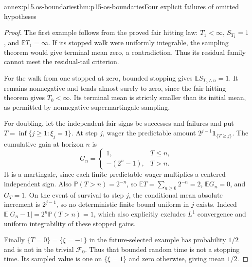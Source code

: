 \begin{annexitem}{annex:p15.os-boundaries}{thm:p15-os-boundaries}{Four explicit failures of omitted hypotheses}
\begin{proof}
The first example follows from the proved fair hitting law:
\(T_1<\infty\), \(S_{T_1}=1\), and \(\mathbb ET_1=\infty\).
If its stopped walk were uniformly integrable, the sampling
theorem would give terminal mean zero, a contradiction.
Thus its residual family cannot meet the residual-tail criterion.

For the walk from one stopped at zero, bounded stopping gives
\(\mathbb ES_{T_0\wedge n}=1\).
It remains nonnegative and tends almost surely to zero, since
the fair hitting theorem gives \(T_0<\infty\).
Its terminal mean is strictly smaller than its initial mean,
as permitted by nonnegative supermartingale sampling.

For doubling, let the independent fair signs be successes and
failures and put \(T=\inf\{j\geq1:\xi_j=1\}\).
At step \(j\), wager the predictable amount
\(2^{j-1}\mathbf1_{\{T\geq j\}}\).
The cumulative gain at horizon \(n\) is
\[
 G_n=
 \begin{cases}
 1,&T\leq n,\\
 -(2^n-1),&T>n.
 \end{cases}
 \]
It is a martingale, since each finite predictable wager
multiplies a centered independent sign.
Also \(\mathbb P(T>n)=2^{-n}\), so
\(\mathbb ET=\sum_{n\geq0}2^{-n}=2\),
\(\mathbb EG_n=0\), and \(G_T=1\).
On the event of survival to step \(j\), the conditional mean
absolute increment is \(2^{j-1}\), so no deterministic finite
bound uniform in \(j\) exists.
Indeed \(\mathbb E|G_n-1|=2^n\mathbb P(T>n)=1\),
which also explicitly excludes \(L^1\) convergence and uniform
integrability of these stopped gains.

Finally \(\{T=0\}=\{\xi=-1\}\) in the future-selected example
has probability \(1/2\) and is not in the trivial
\(\mathcal F_0\). Thus that bounded random time is not a stopping
time. Its sampled value is one on \(\{\xi=1\}\) and zero
otherwise, giving mean \(1/2\).
\end{proof}
\end{annexitem}
